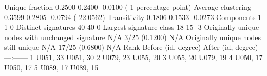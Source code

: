 {}\markdownRendererPipe{} Unique fraction \markdownRendererPipe{} 0.2500 \markdownRendererPipe{} 0.2400 \markdownRendererPipe{} -0.0100 (-1 percentage point) \markdownRendererPipe{}\markdownRendererSoftLineBreak
{}\markdownRendererPipe{} Average clustering \markdownRendererPipe{} 0.3599 \markdownRendererPipe{} 0.2805 \markdownRendererPipe{} -0.0794 (-22.0562\markdownRendererPercentSign{}) \markdownRendererPipe{}\markdownRendererSoftLineBreak
{}\markdownRendererPipe{} Transitivity \markdownRendererPipe{} 0.1806 \markdownRendererPipe{} 0.1533 \markdownRendererPipe{} -0.0273 \markdownRendererPipe{}\markdownRendererSoftLineBreak
{}\markdownRendererPipe{} Components \markdownRendererPipe{} 1 \markdownRendererPipe{} 1 \markdownRendererPipe{} 0 \markdownRendererPipe{}\markdownRendererSoftLineBreak
{}\markdownRendererPipe{} Distinct signatures \markdownRendererPipe{} 40 \markdownRendererPipe{} 40 \markdownRendererPipe{} 0 \markdownRendererPipe{}\markdownRendererSoftLineBreak
{}\markdownRendererPipe{} Largest signature class \markdownRendererPipe{} 18 \markdownRendererPipe{} 15 \markdownRendererPipe{} -3 \markdownRendererPipe{}\markdownRendererSoftLineBreak
{}\markdownRendererPipe{} Originally unique nodes with unchanged signature \markdownRendererPipe{} N/A \markdownRendererPipe{} 3/25 (0.1200) \markdownRendererPipe{} N/A \markdownRendererPipe{}\markdownRendererSoftLineBreak
{}\markdownRendererPipe{} Originally unique nodes still unique \markdownRendererPipe{} N/A \markdownRendererPipe{} 17/25 (0.6800) \markdownRendererPipe{} N/A \markdownRendererPipe{}\markdownRendererParagraphSeparator
{}\markdownRendererParagraphSeparator
{}\markdownRendererPipe{} Rank \markdownRendererPipe{} Before (id, degree) \markdownRendererPipe{} After (id, degree) \markdownRendererPipe{}\markdownRendererSoftLineBreak
{}\markdownRendererPipe{}---:\markdownRendererPipe{}---\markdownRendererPipe{}---\markdownRendererPipe{}\markdownRendererSoftLineBreak
{}\markdownRendererPipe{} 1 \markdownRendererPipe{} U051, 33 \markdownRendererPipe{} U051, 30 \markdownRendererPipe{}\markdownRendererSoftLineBreak
{}\markdownRendererPipe{} 2 \markdownRendererPipe{} U079, 23 \markdownRendererPipe{} U055, 20 \markdownRendererPipe{}\markdownRendererSoftLineBreak
{}\markdownRendererPipe{} 3 \markdownRendererPipe{} U055, 20 \markdownRendererPipe{} U079, 19 \markdownRendererPipe{}\markdownRendererSoftLineBreak
{}\markdownRendererPipe{} 4 \markdownRendererPipe{} U050, 17 \markdownRendererPipe{} U050, 17 \markdownRendererPipe{}\markdownRendererSoftLineBreak
{}\markdownRendererPipe{} 5 \markdownRendererPipe{} U089, 17 \markdownRendererPipe{} U089, 15 \markdownRendererPipe{}\markdownRendererParagraphSeparator

